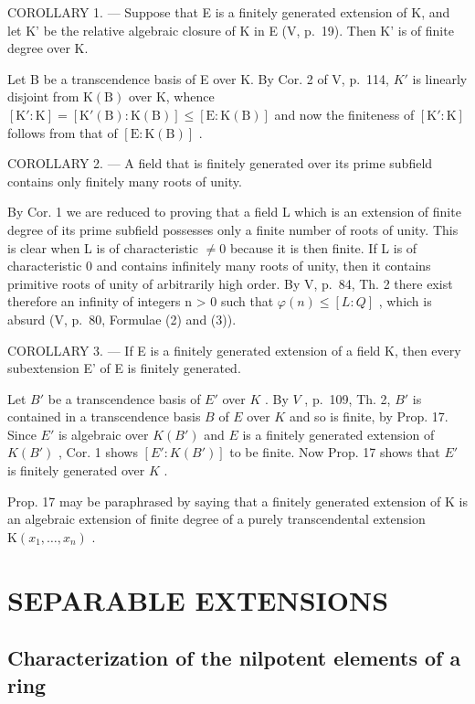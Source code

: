 COROLLARY 1. --- Suppose that E is a finitely generated extension of K, and let K' be the relative algebraic closure of K in E (V, p.~19). Then K' is of finite degree over K.

Let B be a transcendence basis of E over K. By Cor. 2 of V, p.~114, \(K'\) is linearly disjoint from \(\mathrm{K}(\mathrm{B})\) over K, whence \([\mathrm{K}' : \mathrm{K}] = [\mathrm{K}'(\mathrm{B}) : \mathrm{K}(\mathrm{B})] \leq [\mathrm{E} : \mathrm{K}(\mathrm{B})]\) and now the finiteness of \([\mathrm{K}' : \mathrm{K}]\) follows from that of \([\mathrm{E} : \mathrm{K}(\mathrm{B})]\) .

COROLLARY 2. --- A field that is finitely generated over its prime subfield contains only finitely many roots of unity.

By Cor. 1 we are reduced to proving that a field L which is an extension of finite degree of its prime subfield possesses only a finite number of roots of unity. This is clear when L is of characteristic \(\neq0\) because it is then finite. If L is of characteristic 0 and contains infinitely many roots of unity, then it contains primitive roots of unity of arbitrarily high order. By V, p.~84, Th. 2 there exist therefore an infinity of integers n \textgreater{} 0 such that \(\varphi(n) \leqslant [L : Q]\) , which is absurd (V, p.~80, Formulae (2) and (3)).

COROLLARY 3. --- If E is a finitely generated extension of a field K, then every subextension E' of E is finitely generated.

Let \(B'\) be a transcendence basis of \(E'\) over \(K\) . By \(V\) , p.~109, Th. 2, \(B'\) is contained in a transcendence basis \(B\) of \(E\) over \(K\) and so is finite, by Prop. 17. Since \(E'\) is algebraic over \(K(B')\) and \(E\) is a finitely generated extension of \(K(B')\) , Cor. 1 shows \([E': K(B')]\) to be finite. Now Prop. 17 shows that \(E'\) is finitely generated over \(K\) .

Prop. 17 may be paraphrased by saying that a finitely generated extension of K is an algebraic extension of finite degree of a purely transcendental extension \(\mathrm{K}(x_{1},\ldots,x_{n})\) .

\section{SEPARABLE EXTENSIONS}

\subsection{Characterization of the nilpotent elements of a ring}

